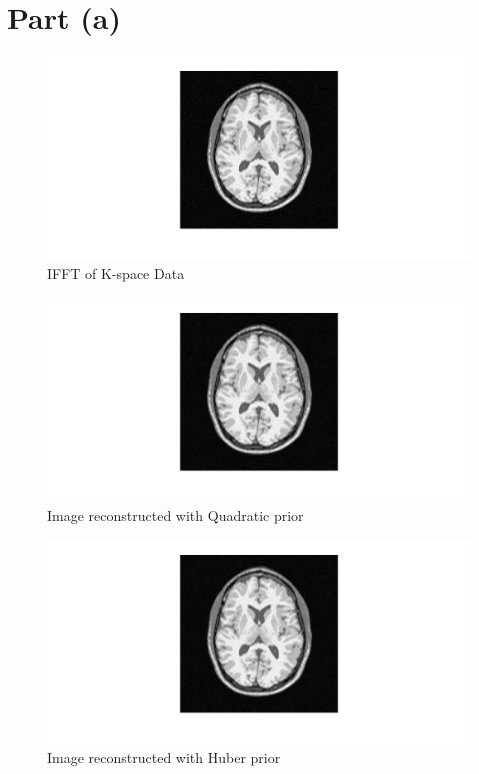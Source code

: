 \documentclass[11pt]{article}
\begin{document}
\maketitle
\section*{Part (a)}

\begin{figure}[H]
\caption{IFFT of K-space Data}
\centerline{\includegraphics[scale=0.3]{ifft}}
\end{figure}

\begin{figure}[H]
\caption{Image reconstructed with Quadratic prior}
\centerline{\includegraphics[scale=0.3]{quadRec}}
\end{figure}

\begin{figure}[H]
\caption{Image reconstructed with Huber prior}
\centerline{\includegraphics[scale=0.3]{huberRec}}
\end{figure}
\end{document}
